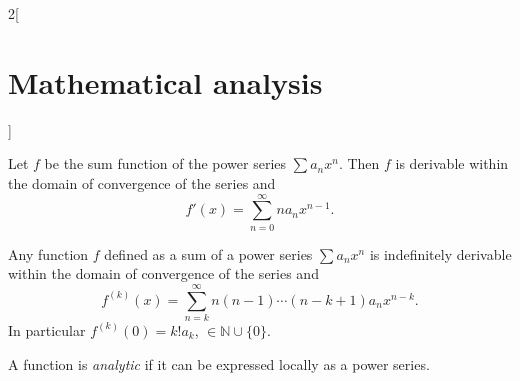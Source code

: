 \documentclass[class=article,crop=false]{standalone}
\begin{document}
\begin{multicols}{2}[\section{Mathematical analysis}]
\begin{corollary}
\end{corollary}
\begin{corollary}
Let $f$ be the sum function of the power series $\sum a_nx^n$. Then $f$ is derivable within the domain of convergence of the series and $$f'(x)=\sum_{n=0}^\infty na_nx^{n-1}.$$
\end{corollary}
\begin{corollary}
Any function $f$ defined as a sum of a power series $\sum a_nx^n$ is indefinitely derivable within the domain of convergence of the series and $$f^{(k)}(x)=\sum_{n=k}^\infty n(n-1)\cdots(n-k+1)a_nx^{n-k}.$$
In particular $f^{(k)}(0)=k!a_k$, $\in\mathbb{N}\cup\{0\}$.
\end{corollary}
\begin{definition}
A function is \textit{analytic} if it can be expressed locally as a power series.
\end{definition}

\end{multicols}
\end{document}
